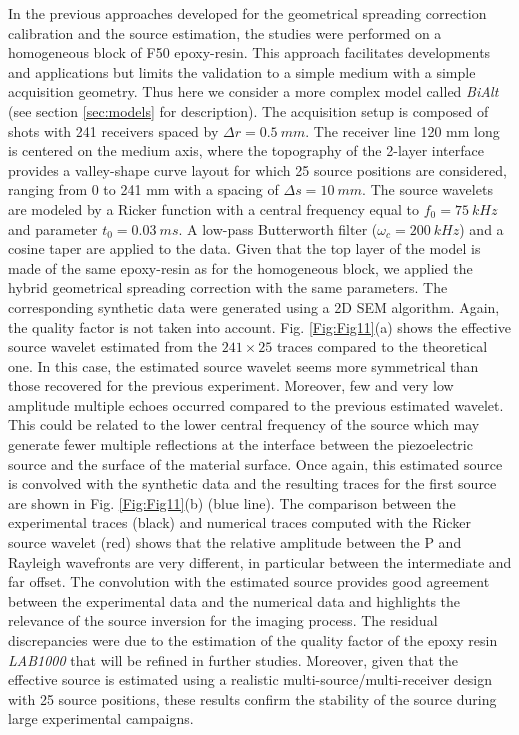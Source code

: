 \documentclass[extra,mreferee]{gji}
\newcommand{\bialt}{\textit{BiAlt} }
\begin{document}
In the previous approaches developed for the geometrical spreading correction calibration and the source estimation, the studies were performed on a homogeneous block of F50 epoxy-resin. This approach facilitates developments and applications but limits the validation to a simple medium with a simple acquisition geometry. Thus here we consider a more complex model called \bialt (see section \ref{sec:models} for description). The acquisition setup is composed of shots with 241 receivers spaced by $\Delta r=0.5\ mm$. The receiver line 120 mm long is centered on the medium axis, where the topography of the 2-layer interface provides a valley-shape curve layout for which 25 source positions are considered, ranging from 0 to 241 mm with a spacing of $\Delta s=10\ mm$. The source wavelets are modeled by a Ricker function with a central frequency equal to $f_{0}=75\ kHz$ and parameter $t_{0}=0.03\ ms$. A low-pass Butterworth filter ($\omega_{c}=200\ kHz$) and a cosine taper are applied to the data. Given that the top layer of the model is made of the same epoxy-resin as for the homogeneous block, we applied the hybrid geometrical spreading correction with the same parameters. The corresponding synthetic data were generated using a 2D SEM algorithm. Again, the quality factor is not taken into account. Fig. \ref{Fig:Fig11}(a) shows the effective source wavelet estimated from the $241 \times 25$ traces compared to the theoretical one. In this case, the estimated source wavelet seems more symmetrical than those recovered for the previous experiment. Moreover, few and very low amplitude multiple echoes occurred compared to the previous estimated wavelet. This could be related to the lower central frequency of the source which may generate fewer multiple reflections at the interface between the piezoelectric source and the surface of the material surface. Once again, this estimated source is convolved with the synthetic data and the resulting traces for the first source are shown in Fig. \ref{Fig:Fig11}(b) (blue line). The comparison between the experimental traces (black) and numerical traces computed with the Ricker source wavelet (red) shows that the relative amplitude between the P and Rayleigh wavefronts are very different, in particular between the intermediate and far offset. The convolution with the estimated source provides good agreement between the experimental data and the numerical data and highlights the relevance of the source inversion for the imaging process. The residual discrepancies were due to the estimation of the quality factor of the epoxy resin \textit{LAB1000} that will be refined in further studies. Moreover, given that the effective source is estimated using a realistic multi-source/multi-receiver design with 25 source positions, these results confirm the stability of the source during large experimental campaigns. 
\end{document}
